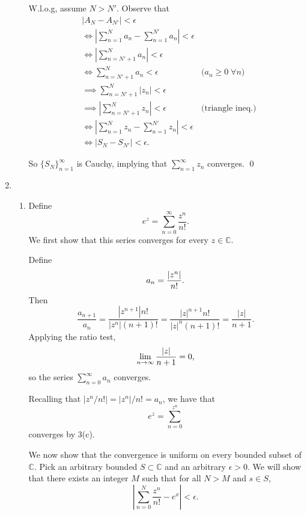 \documentclass[oneside]{article}
\newcommand\abs[1]{\left|#1\right|}
\newcommand\bbC{\mathbb{C}}
\begin{document}
\begin{enumerate}[label=\textbf{\arabic*.}]
\begin{enumerate}[label=\textbf{(\alph*)}]
      W.l.o.g, assume $N > N'$. Observe that \begin{align*}
        &\abs{A_N - A_{N'}} < \epsilon \\
        &\iff \abs{\sum_{n=1}^N a_n - \sum_{n=1}^{N'} a_n} < \epsilon \\
        &\iff \abs{\sum_{n=N'+1}^N a_n} < \epsilon \\
        &\iff \sum_{n=N'+1}^N a_n < \epsilon
          & \text{($a_n \geq 0 \;\forall n$)}\\
        &\implies \sum_{n=N'+1}^N \abs{z_n} < \epsilon \\
        &\implies \abs{\sum_{n=N'+1}^N z_n} < \epsilon
          & \text{(triangle ineq.)}\\
        &\iff \abs{\sum_{n=1}^N z_n - \sum_{n=1}^{N'} z_n} < \epsilon \\
        &\iff \abs{S_N - S_{N'}} < \epsilon\text{.}
      \end{align*}

      So $\{S_N\}_{n=1}^\infty$ is Cauchy, implying that $\sum_{n=1}^\infty z_n$
      converges.
      \qed

  \end{enumerate}

  \item
  \begin{enumerate}[label=\textbf{(\alph*)}]
    \item Define \[
      e^z = \sum_{n=0}^\infty \frac{z^n}{n!}\text{.}
    \]
    We first show that this series converges for every $z \in \bbC$.

    Define \[
      a_n = \frac{\abs{z^n}}{n!} \text.
    \] Then\[
      \frac{a_{n+1}}{a_n}
      = \frac{\abs{z^{n+1}}n!}{\abs{z^n}(n+1)!}
      = \frac{\abs{z}^{n+1}n!}{\abs{z}^n(n+1)!}
      = \frac{\abs{z}}{n+1} \text{.}
    \] Applying the ratio test,\[
      \lim_{n\to\infty} \frac{\abs{z}}{n+1} = 0\text,
    \] so the series $\sum_{n=0}^\infty a_n$ converges.

    Recalling that $\abs{z^n / n!} = \abs{z^n}/n! = a_n$, we have that \[
      e^z = \sum_{n=0}^{z^n}
    \] converges by 3(c).

    We now show that the convergence is uniform on every bounded subset of
    $\bbC$. Pick an arbitrary bounded $S \subset \bbC$ and an arbitrary
    $\epsilon > 0$. We will show that there exists an integer $M$ such that
    for all $N > M$ and $s \in S$, \begin{equation} \label{eq:uniform-conv-def}
      \abs{\sum_{n=0}^N\frac{z^n}{n!} - e^x} < \epsilon \text{.}
    \end{equation}


\end{enumerate}
\end{enumerate}
\end{document}

